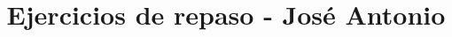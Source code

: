 

\title{Ejercicios de repaso - José Antonio \vspace{-2cm}}
\author{}
\date{ }

\renewcommand\thechoice{\Alph{choice})}
\newcommand\choicelabel{\thechoice}

\newenvironment{choices}%
  {\list{\choicelabel}%
     {\usecounter{choice}\def\makelabel##1{\hss\llap{##1}}%
       \settowidth{\leftmargin}{W.\hskip\labelsep\hskip 2.5em}%
       \def\choice{%
         \item
       } %
       \labelwidth\leftmargin\advance\labelwidth-\labelsep
       \topsep=0pt
       \partopsep=0pt
     }%
  }%
  {\endlist}

\newenvironment{oneparchoices}%
  {%
    \setcounter{choice}{0}%
    \def\choice{%
      \refstepcounter{choice}%
      \ifnum\value{choice}>1\relax
        \penalty -50\hskip 1em plus 1em\relax
      \fi
      \choicelabel
      \nobreak\enskip
    }%
    \ifvmode\else\enskip\fi
    \ignorespaces
  }%
  {}


\maketitle
\fontsize{14}{14}\selectfont

